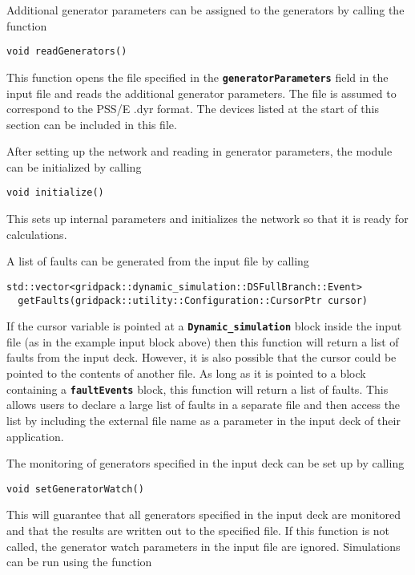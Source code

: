 Additional generator parameters can be assigned to the generators by calling the function

{
\color{red}
\begin{Verbatim}[fontseries=b]
void readGenerators()
\end{Verbatim}
}

This function opens the file specified in the \texttt{\textbf{generatorParameters}} field in the input file and reads the additional generator parameters. The file is assumed to correspond to the PSS/E .dyr format. The devices listed at the start of this section can be included in this file.

After setting up the network and reading in generator parameters, the module can be initialized by calling

{
\color{red}
\begin{Verbatim}[fontseries=b]
void initialize()
\end{Verbatim}
}

This sets up internal parameters and initializes the network so that it is ready for calculations.

A list of faults can be generated from the input file by calling

{
\color{red}
\begin{Verbatim}[fontseries=b]
std::vector<gridpack::dynamic_simulation::DSFullBranch::Event>
  getFaults(gridpack::utility::Configuration::CursorPtr cursor)
\end{Verbatim}
}

If the cursor variable is pointed at a \texttt{\textbf{Dynamic\_simulation}} block inside the input file (as in the example input block above) then this function will return a list of faults from the input deck. However, it is also possible that the cursor could be pointed to the contents of another file. As long as it is pointed to a block containing a \texttt{\textbf{faultEvents}} block, this function will return a list of faults. This allows users to declare a large list of faults in a separate file and then access the list by including the external file name as a parameter in the input deck of their application.

The monitoring of generators specified in the input deck can be set up by calling

{
\color{red}
\begin{Verbatim}[fontseries=b]
void setGeneratorWatch()
\end{Verbatim}
}

This will guarantee that all generators specified in the input deck are monitored and that the results are written out to the specified file. If this function is not called, the generator watch parameters in the input file are ignored.
Simulations can be run using the function

